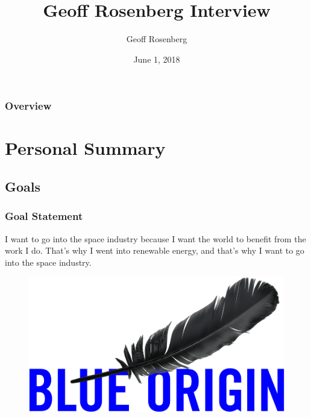 \documentclass[aspectratio=169]{beamer}
\title[Summary Presentation]{Geoff Rosenberg Interview} %
\author{Geoff Rosenberg} %
\institute[] %
{
\textit{Geoff.Rosenberg@gmail.com} %
}
\date{June 1, 2018} %
\begin{document}
\begin{frame}
  \titlepage %
\end{frame}

\begin{frame}
\frametitle{Overview} %
\tableofcontents %
\end{frame}


\section{Personal Summary} %


\subsection{Goals}
\begin{frame}
  \frametitle{Goal Statement}
  I want to go into the space industry because I want the world to
  benefit from the work I do.  That's why I went into renewable
  energy, and that's why I want to go into the space industry.

  \begin{figure}
    \includegraphics[width=0.7\linewidth]{blue-origin-logo.png}
  \end{figure}
\end{frame}
\end{document}
